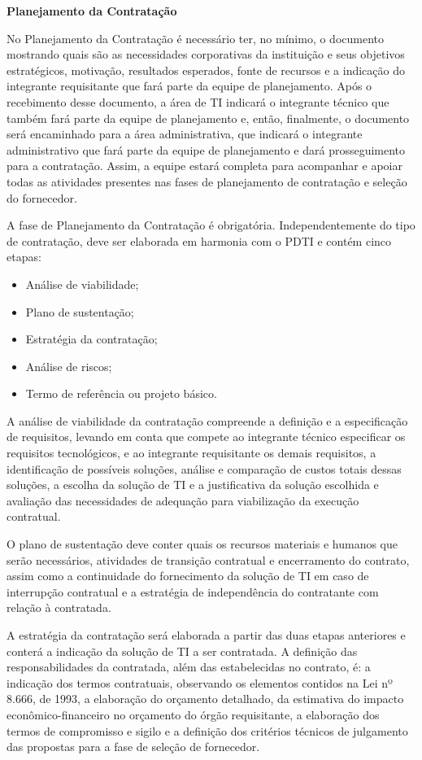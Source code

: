 \textbf {Planejamento da Contratação}

No Planejamento da Contratação é necessário ter, no mínimo, o documento mostrando quais são as necessidades corporativas da instituição e seus objetivos estratégicos, motivação, resultados esperados, fonte de recursos e a indicação do integrante requisitante que fará parte da equipe de planejamento.  Após o recebimento desse documento, a área de TI indicará o integrante técnico que também fará parte da equipe de planejamento e, então, finalmente, o documento será encaminhado para a área administrativa, que indicará o integrante administrativo que fará parte da equipe de planejamento e dará prosseguimento para a contratação. Assim, a equipe estará completa para acompanhar e apoiar todas as atividades presentes nas fases de planejamento de contratação e seleção do fornecedor.

A fase de Planejamento da Contratação é obrigatória. Independentemente do tipo de contratação, deve ser elaborada em harmonia com o PDTI e contém cinco etapas: 
\begin{itemize}
\item Análise de viabilidade; 
\item Plano de sustentação; 
\item Estratégia da contratação; 
\item Análise de riscos; 
\item Termo de referência ou projeto básico.
\end{itemize}

A análise de viabilidade da contratação compreende a definição e a especificação de requisitos, levando em conta que compete ao integrante técnico especificar os requisitos tecnológicos, e ao integrante requisitante os demais requisitos, a identificação de possíveis soluções, análise e comparação de custos totais dessas soluções, a escolha da solução de TI e a justificativa da solução escolhida e avaliação das necessidades de adequação para viabilização da execução contratual. 

O plano de sustentação deve conter quais os recursos materiais e humanos que serão necessários, atividades de transição contratual e encerramento do contrato, assim como a continuidade do fornecimento da solução de TI em caso de interrupção contratual e a estratégia de independência do contratante com relação à contratada. 

A estratégia da contratação será elaborada a partir das duas etapas anteriores e conterá a indicação da solução de TI a ser contratada. A definição das responsabilidades da contratada, além das estabelecidas no contrato, é: a indicação dos termos contratuais, observando os elementos contidos na Lei nº 8.666, de 1993, a elaboração do orçamento detalhado, da estimativa do impacto econômico-financeiro no orçamento do órgão requisitante, a elaboração dos termos de compromisso e sigilo e a definição dos critérios técnicos de julgamento das propostas para a fase de seleção de fornecedor. 

